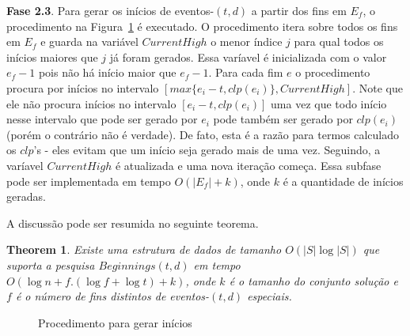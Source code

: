 \documentclass[12pt]{article}
\newtheorem{thm}{Theorem}[section]
\begin{document}
\textbf{Fase 2.3}. Para gerar os inícios de eventos-$(t,d)$ a partir dos fins em $E_f$, o procedimento
na Figura~\ref{fig:beginnings} é executado. O procedimento itera sobre todos os fins em $E_f$ e guarda na variável
$CurrentHigh$ o menor índice $j$ para qual todos os inícios maiores que $j$ já foram gerados. 
Essa varíavel é inicializada com o valor $e_f - 1$ pois não há início maior que $e_f - 1$. Para
cada fim $e$ o procedimento procura por inícios no intervalo $[max\{e_i - t, clp(e_i)\}, CurrentHigh]$.
Note que ele não procura inícios no intervalo $[e_i - t, clp(e_i)]$ uma vez que todo início nesse
intervalo que pode ser gerado por $e_i$ pode também ser gerado por $clp(e_i)$ (porém o contrário
não é verdade). De fato, esta é a razão para termos calculado os $clp$'s - eles evitam que um 
início seja gerado mais de uma vez. Seguindo, a varíavel $CurrentHigh$ é atualizada e uma nova
iteração começa. Essa subfase pode ser implementada em tempo $O(|E_f| + k)$, onde $k$ é a quantidade
de inícios geradas. 

A discussão pode ser resumida no seguinte teorema.

\begin{thm}
Existe uma estrutura de dados de tamanho $O(|S|\log |S|)$ que suporta a pesquisa $Beginnings(t,d)$
em tempo $O(\log n + f.(\log f + \log t) + k)$, onde $k$ é o tamanho do conjunto solução e $f$ 
é o número de fins distintos de eventos-$(t, d)$ especiais. 
\end{thm}


\begin{figure}


\caption{Procedimento para gerar inícios}
\label{fig:beginnings} 
\normalsize

\end{figure}
\end{document}
